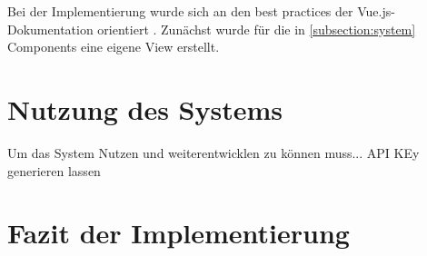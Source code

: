 Bei der Implementierung wurde sich an den best practices der
Vue.js-Dokumentation orientiert . Zunächst wurde für die
in \ref{subsection:system} Components eine eigene View erstellt.


\section{Nutzung des Systems}
Um das System Nutzen und weiterentwicklen zu können muss... API KEy generieren
lassen

\section{Fazit der Implementierung}